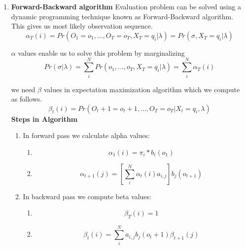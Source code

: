 \documentclass[11pt]{report}
\begin{document}
\begin{enumerate}
\item \textbf{Forward-Backward algorithm} 
Evaluation problem can be solved using a dynamic programming technique known as Forward-Backward algorithm. This gives us most likely observation sequence.
\begin{equation}
\alpha_T(i)=Pr(O_1=o_1,...,O_T=o_T, X_T = q_i | \lambda)= Pr(\sigma, X_T = q_i | \lambda)
\end{equation}

$\alpha$ values enable us to solve this problem by marginalizing
\begin{equation}
Pr(\sigma | \lambda) = \sum\limits_i^{N} Pr(o_1,...,o_T, X_T = q_i | \lambda) = \sum\limits_i^{N} \alpha_T(i)
\end{equation}

we need $\beta$ values in expectation maximization algorithm which we compute as follows.
\begin{equation}
\beta_t(i) = Pr(O_t+1=o_t+1,...,O_T=o_T | X_t = q_i, \lambda)
\end{equation}
\newpage
\textbf{Steps in Algorithm }
\begin{enumerate}
\item In forward pass we calculate alpha values:
\begin{enumerate}
\item \begin{equation}
\alpha_1(i) = \pi_i * b_i(o_1)
\end{equation}

\item \begin{equation} \alpha_{t+1}(j) = [\sum\limits_i^{N} \alpha_t(i) a_{i,j}] b_j(o_{t+1})
\end{equation}
\end{enumerate}
           
\item In backward pass we compute beta values:
\begin{enumerate}
\item \begin{equation}
\beta_T(i) = 1
\end{equation}
\item \begin{equation}
\beta_t(i) = \sum\limits_i^{N} a_{i,j} b_j(o_t+1) \beta_{t+1}(j)
\end{equation}
\end{enumerate}
\end{enumerate}  


\end{enumerate}
\end{document}
